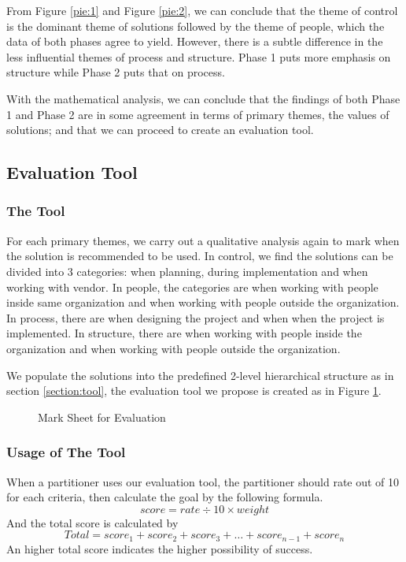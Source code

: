 From Figure \ref{pie:1} and Figure \ref{pie:2}, we can conclude that the theme of control is the dominant theme of solutions followed by the theme of people, which the data of both phases agree to yield. However, there is a subtle difference in the less influential themes of process and structure. Phase 1 puts more emphasis on structure while Phase 2 puts that on process.

With the mathematical analysis, we can conclude that the findings of both Phase 1 and Phase 2 are in some agreement in terms of primary themes, the values of solutions; and that we can proceed to create an evaluation tool.

\subsection{Evaluation Tool}

\subsubsection{The Tool}

For each primary themes, we carry out a qualitative analysis again to mark when the solution is recommended to be used. In control, we find the solutions can be divided into 3 categories: when planning, during implementation and when working with vendor. In people, the categories are when working with people inside same organization and when working with people outside the organization. In process, there are when designing the project and when when the project is implemented. In structure, there are when working with people inside the organization and when working with people outside the organization.

We populate the solutions into the predefined 2-level hierarchical structure as in section \ref{section:tool}, the evaluation tool we propose is created as in Figure \ref{table:tool}.

\begin{figure}[ht]
\centering
\caption{Mark Sheet for Evaluation}
\label{table:tool}
\end{figure}
\subsubsection{Usage of The Tool}

When a partitioner uses our evaluation tool, the partitioner should rate out of 10 for each criteria, then calculate the goal by the following formula.
$$
score = rate \div 10 \times weight
$$
And the total score is calculated by
$$
Total = score_1 + score_2 + score_3 + \ldots + score_{n-1} + score_n
$$
An higher total score indicates the higher possibility of success.